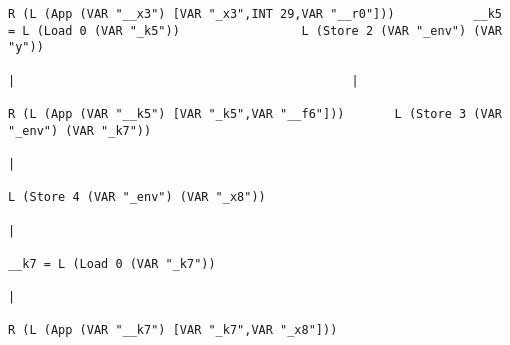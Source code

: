 \begin{landscape}
\begin{lstlisting}[basicstyle=\fontsize{6}{7}\selectfont\ttfamily]
                                    R (L (App (VAR "__x3") [VAR "_x3",INT 29,VAR "__r0"]))           __k5 = L (Load 0 (VAR "_k5"))                 L (Store 2 (VAR "_env") (VAR "y"))
                                                                                                                   |                                               |
                                                                                            R (L (App (VAR "__k5") [VAR "_k5",VAR "__f6"]))       L (Store 3 (VAR "_env") (VAR "_k7"))
                                                                                                                                                                   |
                                                                                                                                                  L (Store 4 (VAR "_env") (VAR "_x8"))
                                                                                                                                                                   |
                                                                                                                                                     __k7 = L (Load 0 (VAR "_k7"))
                                                                                                                                                                   |
                                                                                                                                             R (L (App (VAR "__k7") [VAR "_k7",VAR "_x8"]))

\end{lstlisting}
\end{landscape}
\clearpage

